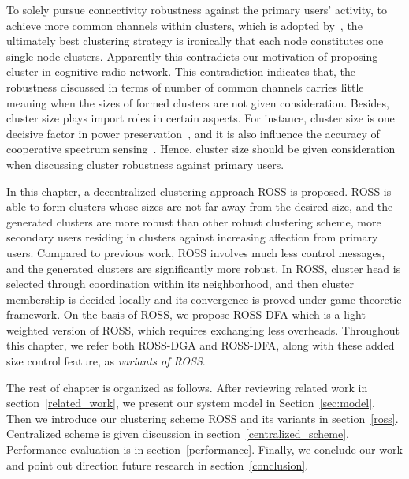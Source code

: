 To solely pursue connectivity robustness against the primary users' activity, \ie to achieve more common channels within clusters, which is adopted by~\cite{Lazos09}, the ultimately best clustering strategy is ironically that each node constitutes one single node clusters.
Apparently this contradicts our motivation of proposing cluster in cognitive radio network.
This contradiction indicates that, the robustness discussed in terms of number of common channels carries little meaning when the sizes of formed clusters are not given consideration.
Besides, cluster size plays import roles in certain aspects.
For instance, cluster size is one decisive factor in power preservation~\cite{clustering_globecom11, EnergyEfficientClusteringRouting_2015}, and it is also influence the accuracy of cooperative spectrum sensing~\cite{Consensus_based_clustering12}.
Hence, cluster size should be given consideration when discussing cluster robustness against primary users.

In this chapter, a decentralized clustering approach ROSS is proposed.
ROSS is able to form clusters whose sizes are not far away from the desired size, and the generated clusters are more robust than other robust clustering scheme, \ie more secondary users residing in clusters against increasing affection from primary users.
Compared to previous work, ROSS involves much less control messages, and the generated clusters are significantly more robust.
In ROSS, cluster head is selected through coordination within its neighborhood, and then cluster membership is decided locally and its convergence is proved under game theoretic framework. 
On the basis of ROSS, we propose \gls{ROSS-DFA} which is a light weighted version of ROSS, which requires exchanging less overheads.
Throughout this chapter, we refer both \gls{ROSS-DGA} and ROSS-DFA, along with these added size control feature, as \textit{variants of ROSS}. 

The rest of chapter is organized as follows. 
After reviewing related work in section~\ref{related_work}, we present our system model in Section~\ref{sec:model}. 
Then we introduce our clustering scheme ROSS and its variants in section~\ref{ross}.
Centralized scheme is given discussion in section~\ref{centralized_scheme}.
Performance evaluation is in section~\ref{performance}.
Finally, we conclude our work and point out direction future research in section~\ref{conclusion}.


